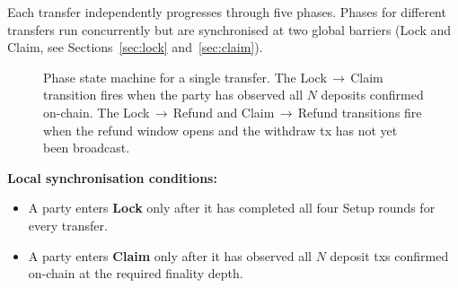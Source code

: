 \documentclass[11pt,a4paper,dvipsnames]{article}
\begin{document}
Each transfer independently progresses through five phases.
Phases for different transfers run concurrently but are synchronised at two
global barriers (Lock and Claim, see Sections~\ref{sec:lock}
and~\ref{sec:claim}).

\begin{figure}[h]
\centering
{}
\caption{Phase state machine for a single transfer.
  The Lock$\,\to\,$Claim transition fires when the party has observed all
  $N$ deposits confirmed on-chain.
  The Lock$\,\to\,$Refund and Claim$\,\to\,$Refund transitions fire when
  the refund window opens and the withdraw tx has not yet been broadcast.}
\label{fig:phases}
\end{figure}

\noindent\textbf{Local synchronisation conditions:}
\begin{itemize}
  \item A party enters \textbf{Lock} only after it has completed all four
    Setup rounds for every transfer.
  \item A party enters \textbf{Claim} only after it has observed all $N$
    deposit txs confirmed on-chain at the required finality depth.
\end{itemize}
\end{document}
